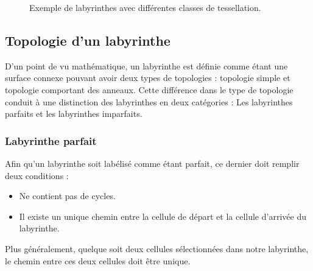 \begin{figure}[htp] 
    \centering
    \hfill%
        \hfill%
    \caption{Exemple de labyrinthes avec différentes classes de tessellation.}
\end{figure}


\subsection{Topologie d'un labyrinthe}
D’un point de vu mathématique, un labyrinthe est définie comme étant une surface connexe pouvant avoir deux types de topologies : topologie simple et topologie comportant des anneaux. Cette différence dans le type de topologie conduit à une distinction des labyrinthes en deux catégories : Les labyrinthes parfaits et les labyrinthes imparfaits.

\subsubsection{Labyrinthe parfait}
Afin qu’un labyrinthe soit labélisé comme étant parfait, ce dernier doit remplir deux conditions :
\begin{itemize}
\item Ne contient pas de cycles.
\item Il existe un unique chemin entre la cellule de départ et la cellule d’arrivée du labyrinthe.
\end{itemize}
Plus généralement, quelque soit deux cellules sélectionnées dans notre labyrinthe, le chemin entre ces deux cellules doit être unique.

